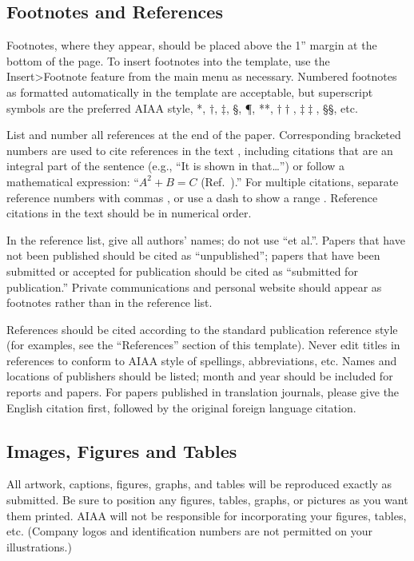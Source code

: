 \documentclass[conf]{new-aiaa}
\begin{document}
\subsection{Footnotes and References}
Footnotes, where they appear, should be placed above the 1'' margin at the bottom of the page. To insert footnotes into the template, use the Insert>Footnote feature from the main menu as necessary. Numbered footnotes as formatted automatically in the template are acceptable, but superscript  symbols are the preferred AIAA style, *, $\dag$, $\ddag$, \S, \P, **, $\dag\dag$, $\ddag\ddag$, \S\S, etc.

List and number all references at the end of the paper. Corresponding bracketed numbers are used to cite references in the text \cite{vatistas1986reverse}, including citations that are an integral part of the sentence (e.g., ``It is shown in \cite{dornheim1996planetary} that\ldots '') or follow a mathematical expression: ``$A^{2} + B = C$ (Ref.~\cite{terster1997nasa}).'' For multiple citations, separate reference numbers with commas \cite{peyret2012computational,oates1997aerothermodynamics}, or use a dash to show a range \cite{volpe1994techniques,thompsonspacecraft,chi1993fluid}. Reference citations in the text should be in numerical order.

In the reference list, give all authors' names; do not use ``et al.''. Papers that have not been published should be cited as ``unpublished''; papers that have been submitted or accepted for publication should be cited as ``submitted for publication.'' Private communications and personal website should appear as footnotes rather than in the reference list.

References should be cited according to the standard publication reference style (for examples, see the ``References'' section of this template). Never edit titles in references to conform to AIAA style of spellings, abbreviations, etc. Names and locations of publishers should be listed; month and year should be included for reports and papers. For papers published in translation journals, please give the English citation first, followed by the original foreign language citation.

\subsection{Images, Figures and Tables}
All artwork, captions, figures, graphs, and tables will be reproduced exactly as submitted. Be sure to position any figures, tables, graphs, or pictures as you want them printed. AIAA will not be responsible for incorporating your figures, tables, etc. (Company logos and identification numbers are not permitted on your illustrations.)
\end{document}
